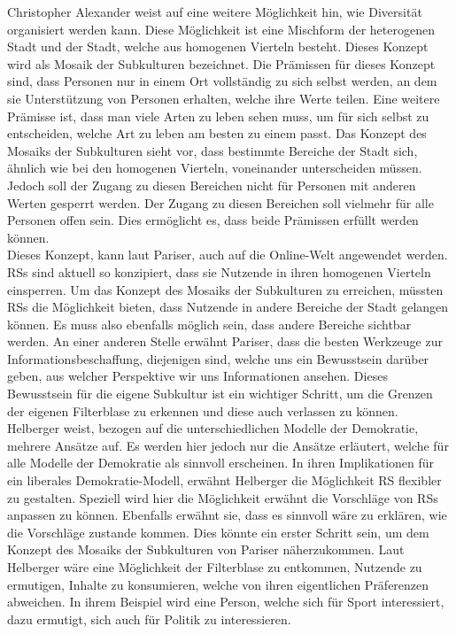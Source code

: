 Christopher Alexander weist auf eine weitere Möglichkeit hin, wie Diversität organisiert werden kann.
Diese Möglichkeit ist eine Mischform der heterogenen Stadt und der Stadt, welche aus homogenen Vierteln besteht.
Dieses Konzept wird als Mosaik der Subkulturen bezeichnet.
Die Prämissen für dieses Konzept sind, dass Personen nur in einem Ort vollständig zu sich selbst werden, an dem sie Unterstützung von Personen erhalten, welche ihre Werte teilen.
Eine weitere Prämisse ist, dass man viele Arten zu leben sehen muss, um für sich selbst zu entscheiden, welche Art zu leben am besten zu einem passt.
Das Konzept des Mosaiks der Subkulturen sieht vor, dass bestimmte Bereiche der Stadt sich, ähnlich wie bei den homogenen Vierteln, voneinander unterscheiden müssen.
Jedoch soll der Zugang zu diesen Bereichen nicht für Personen mit anderen Werten gesperrt werden.
Der Zugang zu diesen Bereichen soll vielmehr für alle Personen offen sein.
Dies ermöglicht es, dass beide Prämissen erfüllt werden können.\\

Dieses Konzept, kann laut Pariser, auch auf die Online-Welt angewendet werden.
\acp{RS} sind aktuell so konzipiert, dass sie Nutzende in ihren homogenen Vierteln einsperren.
Um das Konzept des Mosaiks der Subkulturen zu erreichen, müssten \acp{RS} die Möglichkeit bieten, dass Nutzende in andere Bereiche der Stadt gelangen können.
Es muss also ebenfalls möglich sein, dass andere Bereiche sichtbar werden.
An einer anderen Stelle erwähnt Pariser, dass die besten Werkzeuge zur Informationsbeschaffung, diejenigen sind, welche uns ein Bewusstsein darüber geben, aus welcher Perspektive wir uns Informationen ansehen.
Dieses Bewusstsein für die eigene Subkultur ist ein wichtiger Schritt, um die Grenzen der eigenen Filterblase zu erkennen und diese auch verlassen zu können.\\

Helberger weist, bezogen auf die unterschiedlichen Modelle der Demokratie, mehrere Ansätze auf.
Es werden hier jedoch nur die Ansätze erläutert, welche für alle Modelle der Demokratie als sinnvoll erscheinen.
In ihren Implikationen für ein liberales Demokratie-Modell, erwähnt Helberger die Möglichkeit \ac{RS} flexibler zu gestalten.
Speziell wird hier die Möglichkeit erwähnt die Vorschläge von \acp{RS} anpassen zu können.
Ebenfalls erwähnt sie, dass es sinnvoll wäre zu erklären, wie die Vorschläge zustande kommen.
Dies könnte ein erster Schritt sein, um dem Konzept des Mosaiks der Subkulturen von Pariser näherzukommen.
Laut Helberger wäre eine Möglichkeit der Filterblase zu entkommen, Nutzende zu ermutigen, Inhalte zu konsumieren, welche von ihren eigentlichen Präferenzen abweichen.
In ihrem Beispiel wird eine Person, welche sich für Sport interessiert, dazu ermutigt, sich auch für Politik zu interessieren.\\

